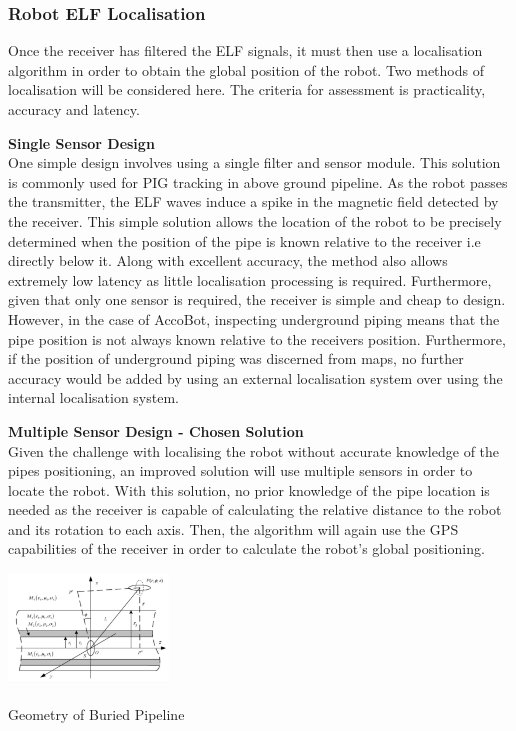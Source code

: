 \documentclass[11pt]{article}		%
\newcommand{\supercite}[1]{\textsuperscript{\cite{#1}}}		%
\begin{document}
			\subsubsection{Robot ELF Localisation} \label{elfLocalisation}
			
			Once the receiver has filtered the ELF signals, it must then use a localisation algorithm in order to obtain the global position of the robot. Two methods of localisation will be considered here. The criteria for assessment is practicality, accuracy and latency. 
			
			\textbf{Single Sensor Design}
			\\
			One simple design involves using a single filter and sensor module. This solution is commonly used for PIG tracking in above ground pipeline. As the robot passes the transmitter, the ELF waves induce a spike in the magnetic field detected by the receiver. This simple solution allows the location of the robot to be precisely determined when the position of the pipe is known relative to the receiver i.e directly below it. Along with excellent accuracy, the method also allows extremely low latency as little localisation processing is required. Furthermore, given that only one sensor is required, the receiver is simple and cheap to design. 
			\\
	    	\hspace*{2ex}However, in the case of AccoBot, inspecting underground piping means that the pipe position is not always known relative to the receivers position. Furthermore, if the position of underground piping was discerned from maps, no further accuracy would be added by using an external localisation system over using the internal localisation system. 
	
	        \textbf{Multiple Sensor Design - Chosen Solution}
			\\
		    Given the challenge with localising the robot without accurate knowledge of the pipes positioning, an improved solution will use multiple sensors in order to locate the robot. With this solution, no prior knowledge of the pipe location is needed as the receiver is capable of calculating the relative distance to the robot and its rotation to each axis. Then, the algorithm will again use the GPS capabilities of the receiver in order to calculate the robot's global positioning.
			
			\begin{floatingfigure}[r]{0.35\textwidth}
				\centering
				\includegraphics[width=0.32\textwidth]{localisation}
				\caption{Geometry of Buried Pipeline\supercite{ELFTransmitter}}
				\label{localisation}
			\end{floatingfigure}
			
\end{document}
